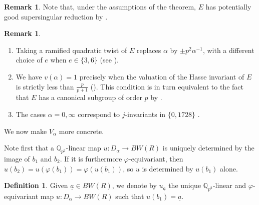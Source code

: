 \documentclass{amsart}
\theoremstyle{definition}
\newtheorem{definition}[theorem]{Definition}
\newtheorem{remark}[theorem]{Remark}
\newcommand{\Q}{\mathbb{Q}}
\newcommand{\Dbasis}{b}
\numberwithin{theorem}{section}
\numberwithin{equation}{section}
\begin{document}
\begin{remark}
    Note that, under the assumptions of the theorem, $E$ has potentially good supersingular reduction by .
\end{remark}

\begin{remark}\label{rmk: alpha role}\phantom{~}
\begin{enumerate}
    \item Taking a ramified quadratic twist of $E$ replaces $\alpha$ by $\pm p^2\alpha^{-1}$, with a different choice of $e$ when $e \in \{3,6\}$  (see \cite[top of p.~25]{Volkov}).
    \item We have $v(\alpha)=1$ precisely when the valuation of the Hasse invariant of $E$ is strictly less than $\frac{p}{p+1}$ (\cite[p.~133]{Volkov}). This condition is in turn equivalent to the fact that $E$ has a canonical subgroup of order $p$ by \cite[Theorem 3.1]{MR447119}.
    \item The cases $\alpha=0,\infty$ correspond to $j$-invariants in $\{0,1728\}$ \cite[p.~26]{Volkov}.
\end{enumerate}
\end{remark}


We now make $V_\alpha$ more concrete. 

Note first that a $\Q_{p^2}$-linear map $u : D_\alpha \to BW(R)$ is uniquely determined by the image of $\Dbasis_1$ and $\Dbasis_2$. If it is furthermore $\varphi$-equivariant, then $u(\Dbasis_2) = u(\varphi(\Dbasis_1))=\varphi(u(\Dbasis_1))$, so $u$ is determined by $u(\Dbasis_1)$ alone.

\begin{definition}\label{def: map u subscript a}
Given $\underline{a} \in BW(R)$, we denote by $u_{\underline{a}}$ the unique $\Q_{p^2}$-linear and $\varphi$-equivariant map $u: D_\alpha \to BW(R)$ such that $u(\Dbasis_1)=\underline{a}$.
\end{definition}
\end{document}
